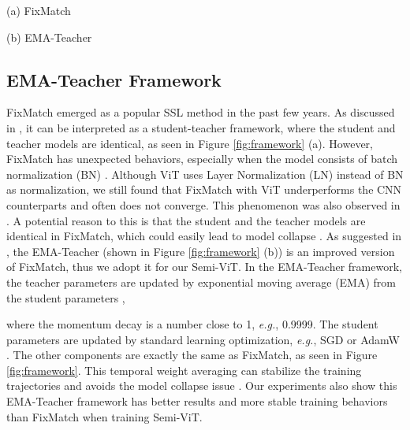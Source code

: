 \documentclass{article}
\newcommand\eg{\emph{e.g.}}
\begin{document}
\begin{figure*}[t]
\begin{minipage}[b]{.49\linewidth}
\centering
\centerline{}{(a) FixMatch}
\end{minipage}
\hfill
\begin{minipage}[b]{.49\linewidth}
\centering
\centerline{}{(b) EMA-Teacher}
\end{minipage}
\caption{The framework comparison between FixMatch (a) and EMA-Teacher (b). / is the strongly/weakly augmented view of a sample , and  is the model parameters.}
\label{fig:framework}\end{figure*}

\subsection{EMA-Teacher Framework}

FixMatch \cite{DBLP:conf/nips/SohnBCZZRCKL20} emerged as a popular SSL method in the past few years. As discussed in \cite{DBLP:conf/cvpr/CaiRMFTS21}, it can be interpreted as a student-teacher framework, where the student and teacher models are identical, as seen in Figure \ref{fig:framework} (a). 
However, FixMatch has unexpected behaviors, especially when the model consists of batch normalization (BN) \cite{DBLP:conf/icml/IoffeS15}. Although ViT uses Layer Normalization (LN) \cite{DBLP:journals/corr/BaKH16} instead of BN as normalization, we still found that FixMatch with ViT underperforms the CNN counterparts and often does not converge. This phenomenon was also observed in \cite{weng2021semi}. A potential reason to this is that the student and the teacher models are identical in FixMatch, which could easily lead to model collapse \cite{DBLP:conf/cvpr/He0WXG20,DBLP:conf/nips/GrillSATRBDPGAP20}. As suggested in \cite{DBLP:conf/cvpr/CaiRMFTS21}, the EMA-Teacher (shown in Figure \ref{fig:framework} (b)) is an improved version of FixMatch, thus we adopt it for our Semi-ViT. In the EMA-Teacher framework, the teacher parameters  are updated by exponential moving average (EMA) from the student parameters , 

where the momentum decay  is a number close to 1, \eg, 0.9999. The student parameters are updated by standard learning optimization, \eg, SGD or AdamW \cite{DBLP:conf/iclr/LoshchilovH19}. The other components are exactly the same as FixMatch, as seen in Figure \ref{fig:framework}. This temporal weight averaging can stabilize the training trajectories \cite{DBLP:conf/iclr/AthiwaratkunFIW19,DBLP:conf/uai/IzmailovPGVW18} and avoids the model collapse issue \cite{DBLP:conf/cvpr/He0WXG20,DBLP:conf/nips/GrillSATRBDPGAP20}. Our experiments also show this EMA-Teacher framework has better results and more stable training behaviors than FixMatch when training Semi-ViT. 
\end{document}
